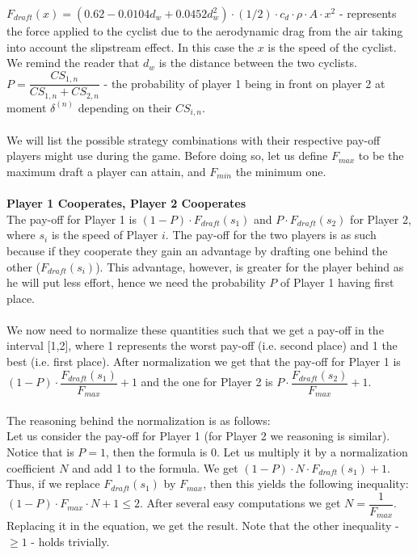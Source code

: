 \documentclass[10pt, a4paper]{report}
\begin{document}
$F_{draft}(x)=(0.62 - 0.0104d_w + 0.0452 d_w^2)\cdot (1/2)\cdot c_d\cdot \rho\cdot A\cdot x^2$ -  represents the force applied to the cyclist due to the aerodynamic drag from the air taking into account the slipstream effect. In this case the $x$ is the speed of the cyclist. We remind the reader that $d_w$ is the distance between the two cyclists.
$P = \dfrac{CS_{1,n}}{CS_{1,n}+CS_{2,n}}$ - the probability of player 1 being in front on player 2 at moment $\delta^{(n)}$ depending on their $CS_{i,n}$.
\\\\
We will list the possible strategy combinations with their respective pay-off players might use during the game. Before doing so, let us define $F_{max}$ to be the maximum draft a player can attain, and $F_{min}$ the minimum one.
\\\\
\textbf{Player 1 Cooperates, Player 2 Cooperates}
\\
The pay-off for Player 1 is $(1-P)\cdot F_{draft}(s_1)$ and $P \cdot F_{draft}(s_2)$ for Player 2, where $s_i$ is the speed of Player $i$. The pay-off for the two players is as such because if they cooperate they gain an advantage by drafting one behind the other ($F_{draft}(s_i)$). This advantage, however, is greater for the player behind as he will put less effort, hence we need the probability $P$ of Player 1 having first place.
\\\\
We now need to normalize these quantities such that we get a pay-off in the interval [1,2], where 1 represents the worst pay-off (i.e. second place) and 1 the best (i.e. first place). After normalization we get that the pay-off for Player 1 is $(1-P)\cdot \dfrac{F_{draft}(s_1)}{F_{max}} + 1$ and the one for Player 2 is $P\cdot \dfrac{F_{draft}(s_2)}{F_{max}} + 1$.
\\\\
The reasoning behind the normalization is as follows:\\
Let us consider the pay-off for Player 1 (for Player 2 we reasoning is similar). Notice that is $P=1$, then the formula is 0. Let us multiply it by a normalization coefficient $N$ and add 1 to the formula. We get $(1-P)\cdot N\cdot F_{draft}(s_1)  + 1$. Thus, if we replace $F_{draft}(s_1)$ by $F_{max}$, then this yields the following inequality: $(1-P)\cdot F_{max} \cdot N + 1\le 2$. After several easy computations we get $N = \dfrac{1}{F_{max}}$. Replacing it in the equation, we get the result. Note that the other inequality - $\ge 1$ - holds trivially.
\end{document}
